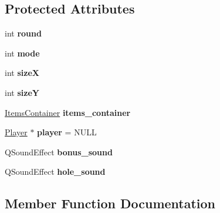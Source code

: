 \subsection*{Protected Attributes}
\begin{DoxyCompactItemize}
\item 
int {\bfseries round}\hypertarget{class_game_engine_aa28d21ca6308c68892642f112a9f576a}{}\label{class_game_engine_aa28d21ca6308c68892642f112a9f576a}

\item 
int {\bfseries mode}\hypertarget{class_game_engine_a7145ec824cc63e5323fd8f5a074ec342}{}\label{class_game_engine_a7145ec824cc63e5323fd8f5a074ec342}

\item 
int {\bfseries sizeX}\hypertarget{class_game_engine_a5b500d38dc898994a2e0f53a923fe0a5}{}\label{class_game_engine_a5b500d38dc898994a2e0f53a923fe0a5}

\item 
int {\bfseries sizeY}\hypertarget{class_game_engine_ad720d519a87110aea56f8c896de586e9}{}\label{class_game_engine_ad720d519a87110aea56f8c896de586e9}

\item 
\hyperlink{class_items_container}{Items\+Container} {\bfseries items\+\_\+container}\hypertarget{class_game_engine_a306792ba7de2bd02ac487425a449992c}{}\label{class_game_engine_a306792ba7de2bd02ac487425a449992c}

\item 
\hyperlink{class_player}{Player} $\ast$ {\bfseries player} = N\+U\+LL\hypertarget{class_game_engine_aabcb1d42f2f2a0d49abb6f010599eb78}{}\label{class_game_engine_aabcb1d42f2f2a0d49abb6f010599eb78}

\item 
Q\+Sound\+Effect {\bfseries bonus\+\_\+sound}\hypertarget{class_game_engine_a5e986b659dd5a4c57039332c7e468e99}{}\label{class_game_engine_a5e986b659dd5a4c57039332c7e468e99}

\item 
Q\+Sound\+Effect {\bfseries hole\+\_\+sound}\hypertarget{class_game_engine_a218635f0033570563613c93a94decdf6}{}\label{class_game_engine_a218635f0033570563613c93a94decdf6}

\end{DoxyCompactItemize}


\subsection{Member Function Documentation}
